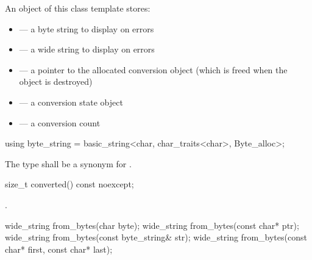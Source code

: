 \pnum
An object of this class template stores:

\begin{itemize}
\item {} --- a byte string to display on errors
\item {} --- a wide string to display on errors
\item {} --- a pointer to the allocated conversion object
(which is freed when the  object is destroyed)
\item {} --- a conversion state object
\item {} --- a conversion count
\end{itemize}

%
\begin{itemdecl}
using byte_string = basic_string<char, char_traits<char>, Byte_alloc>;
\end{itemdecl}

\begin{itemdescr}
\pnum
The type shall be a synonym for .
\end{itemdescr}

%
\begin{itemdecl}
size_t converted() const noexcept;
\end{itemdecl}

\begin{itemdescr}
\pnum
\returns {}.
\end{itemdescr}

%
\begin{itemdecl}
wide_string from_bytes(char byte);
wide_string from_bytes(const char* ptr);
wide_string from_bytes(const byte_string& str);
wide_string from_bytes(const char* first, const char* last);
\end{itemdecl}

